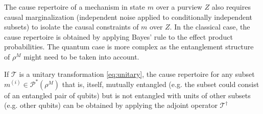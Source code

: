 \documentclass[preprints, article, accept, pdftex, moreauthors, letterpaper]{Definitions/mdpi}
\renewcommand{\=}[1]{\stackrel{#1}{=}} %
\newcommand{\T}{\mathcal{T}} %
\renewcommand{\*}{\otimes}%
\begin{document}

The cause repertoire of a mechanism in state $m$ over a purview $Z$ also requires causal marginalization (independent noise applied to conditionally independent subsets) to isolate the causal constraints of $m$ over $Z$. In the classical case, the cause repertoire is obtained by applying Bayes' rule to the effect product probabilities. The quantum case is more complex as the entanglement structure of $\rho^M$ might need to be taken into account.

If $\T$ is a unitary transformation \eqref{eq:unitary}, the cause repertoire for any subset $m^{(i)} \in \mathcal{P}^*(\rho^M)$ that is, itself, mutually entangled (e.g. the subset could consist of an entangled pair of qubits) but is not entangled with units of other subsets (e.g. other qubits) can be obtained by applying the adjoint operator $\T^\dag$
\end{document}
